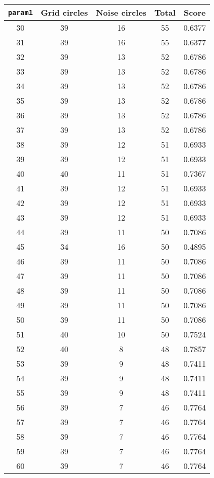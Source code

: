 \documentclass[letterpaper, 12pt]{article}
\begin{document}
\begin{longtable}{|c|c|c|c|c|}
\hline
\textbf{\texttt{param1}} & \textbf{Grid circles} & \textbf{Noise circles} & \textbf{Total} & \textbf{Score} \\
\hline
30 & 39 & 16 & 55 & 0.6377 \\
\hline
31 & 39 & 16 & 55 & 0.6377 \\
\hline
32 & 39 & 13 & 52 & 0.6786 \\
\hline
33 & 39 & 13 & 52 & 0.6786 \\
\hline
34 & 39 & 13 & 52 & 0.6786 \\
\hline
35 & 39 & 13 & 52 & 0.6786 \\
\hline
36 & 39 & 13 & 52 & 0.6786 \\
\hline
37 & 39 & 13 & 52 & 0.6786 \\
\hline
38 & 39 & 12 & 51 & 0.6933 \\
\hline
39 & 39 & 12 & 51 & 0.6933 \\
\hline
40 & 40 & 11 & 51 & 0.7367 \\
\hline
41 & 39 & 12 & 51 & 0.6933 \\
\hline
42 & 39 & 12 & 51 & 0.6933 \\
\hline
43 & 39 & 12 & 51 & 0.6933 \\
\hline
44 & 39 & 11 & 50 & 0.7086 \\
\hline
45 & 34 & 16 & 50 & 0.4895 \\
\hline
46 & 39 & 11 & 50 & 0.7086 \\
\hline
47 & 39 & 11 & 50 & 0.7086 \\
\hline
48 & 39 & 11 & 50 & 0.7086 \\
\hline
49 & 39 & 11 & 50 & 0.7086 \\
\hline
50 & 39 & 11 & 50 & 0.7086 \\
\hline
51 & 40 & 10 & 50 & 0.7524 \\
\hline
52 & 40 & 8 & 48 & 0.7857 \\
\hline
53 & 39 & 9 & 48 & 0.7411 \\
\hline
54 & 39 & 9 & 48 & 0.7411 \\
\hline
55 & 39 & 9 & 48 & 0.7411 \\
\hline
56 & 39 & 7 & 46 & 0.7764 \\
\hline
57 & 39 & 7 & 46 & 0.7764 \\
\hline
58 & 39 & 7 & 46 & 0.7764 \\
\hline
59 & 39 & 7 & 46 & 0.7764 \\
\hline
60 & 39 & 7 & 46 & 0.7764 \\

\end{longtable}
\end{document}
